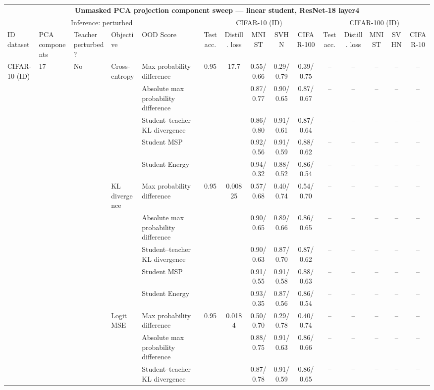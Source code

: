 \documentclass[border=2pt]{standalone}
\begin{document}
\scriptsize
\setlength{\tabcolsep}{3pt}
\begin{tabular}{lllllcccccccccc}
\multicolumn{15}{c}{\textbf{Unmasked PCA projection component sweep --- linear student, ResNet-18 layer4}}\\[4pt]
\multicolumn{5}{c}{Inference: perturbed} & \multicolumn{5}{c}{CIFAR-10 (ID)} & \multicolumn{5}{c}{CIFAR-100 (ID)} \\
\cmidrule(lr){6-10} \cmidrule(lr){11-15}
\toprule
ID dataset & PCA components & Teacher perturbed? & Objective & OOD Score & Test acc. & Distill. loss & MNIST & SVHN & CIFAR-100 & Test acc. & Distill. loss & MNIST & SVHN & CIFAR-10 \\
\midrule
CIFAR-10 (ID) & 17 & No & Cross-entropy & Max probability difference & 0.95 & 17.7 & 0.55/0.66 & 0.29/0.79 & 0.39/0.75 & -- & -- & -- & -- & -- \\
 &  &  &  & Absolute max probability difference &  &  & 0.87/0.77 & 0.90/0.65 & 0.87/0.67 & -- & -- & -- & -- & -- \\
 &  &  &  & Student--teacher KL divergence &  &  & 0.86/0.80 & 0.91/0.61 & 0.87/0.64 & -- & -- & -- & -- & -- \\
 &  &  &  & Student MSP &  &  & 0.92/0.56 & 0.91/0.59 & 0.88/0.62 & -- & -- & -- & -- & -- \\
 &  &  &  & Student Energy &  &  & 0.94/0.32 & 0.88/0.52 & 0.86/0.54 & -- & -- & -- & -- & -- \\
 &  &  & KL divergence & Max probability difference & 0.95 & 0.00825 & 0.57/0.68 & 0.40/0.74 & 0.54/0.70 & -- & -- & -- & -- & -- \\
 &  &  &  & Absolute max probability difference &  &  & 0.90/0.65 & 0.89/0.66 & 0.86/0.65 & -- & -- & -- & -- & -- \\
 &  &  &  & Student--teacher KL divergence &  &  & 0.90/0.63 & 0.87/0.70 & 0.87/0.62 & -- & -- & -- & -- & -- \\
 &  &  &  & Student MSP &  &  & 0.91/0.55 & 0.91/0.58 & 0.88/0.63 & -- & -- & -- & -- & -- \\
 &  &  &  & Student Energy &  &  & 0.93/0.35 & 0.87/0.56 & 0.86/0.54 & -- & -- & -- & -- & -- \\
 &  &  & Logit MSE & Max probability difference & 0.95 & 0.0184 & 0.50/0.70 & 0.29/0.78 & 0.40/0.74 & -- & -- & -- & -- & -- \\
 &  &  &  & Absolute max probability difference &  &  & 0.88/0.75 & 0.91/0.63 & 0.86/0.66 & -- & -- & -- & -- & -- \\
 &  &  &  & Student--teacher KL divergence &  &  & 0.87/0.78 & 0.91/0.59 & 0.86/0.65 & -- & -- & -- & -- & -- \\

\end{tabular}
\end{document}
